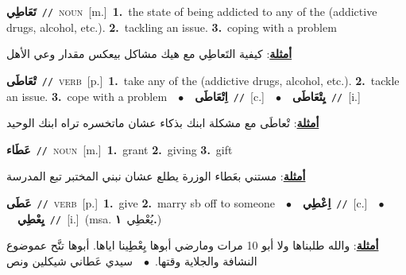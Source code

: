 \documentclass[10pt,a4paper,twoside]{article} %
\begin{document}
\begin{multicols}{2}
{\setlength\topsep{0pt}\textbf{\foreignlanguage{arabic}{تَعَاطِي}}\ {\color{gray}\texttt{//}\color{black}}\ \textsc{noun}\ [m.]\ \textbf{1.}~the state of being addicted to any of the (addictive drugs, alcohol, etc.).  \textbf{2.}~tackling an issue.  \textbf{3.}~coping with a problem\  \begin{flushright}\color{gray}\foreignlanguage{arabic}{\textbf{\underline{\foreignlanguage{arabic}{أمثلة}}}: كيفية التَعاطِي مع هيك مشاكل بيعكس مقدار وعي الأهل}\end{flushright}\color{black}} \vspace{2mm}

{\setlength\topsep{0pt}\textbf{\foreignlanguage{arabic}{تْعَاطَى}}\ {\color{gray}\texttt{//}\color{black}}\ \textsc{verb}\ [p.]\ \textbf{1.}~take any of the (addictive drugs, alcohol, etc.).  \textbf{2.}~tackle an issue.  \textbf{3.}~cope with a problem\ \ $\bullet$\ \ \setlength\topsep{0pt}\textbf{\foreignlanguage{arabic}{اِتْعَاطَى}}\ {\color{gray}\texttt{//}\color{black}}\ [c.]\ \ $\bullet$\ \ \setlength\topsep{0pt}\textbf{\foreignlanguage{arabic}{يِتْعَاطَى}}\ {\color{gray}\texttt{//}\color{black}}\ [i.]\  \begin{flushright}\color{gray}\foreignlanguage{arabic}{\textbf{\underline{\foreignlanguage{arabic}{أمثلة}}}: تْعاطَى مع مشكلة ابنك بذكاء عشان ماتخسره تراه ابنك الوحيد}\end{flushright}\color{black}} \vspace{2mm}

{\setlength\topsep{0pt}\textbf{\foreignlanguage{arabic}{عَطَاء}}\ {\color{gray}\texttt{//}\color{black}}\ \textsc{noun}\ [m.]\ \textbf{1.}~grant  \textbf{2.}~giving  \textbf{3.}~gift\  \begin{flushright}\color{gray}\foreignlanguage{arabic}{\textbf{\underline{\foreignlanguage{arabic}{أمثلة}}}: مستني بعَطاء الوزرة يطلع عشان نبني المختبر تبع المدرسة}\end{flushright}\color{black}} \vspace{2mm}

{\setlength\topsep{0pt}\textbf{\foreignlanguage{arabic}{عَطَى}}\ {\color{gray}\texttt{//}\color{black}}\ \textsc{verb}\ [p.]\ \textbf{1.}~give  \textbf{2.}~marry sb off to someone\ \ $\bullet$\ \ \setlength\topsep{0pt}\textbf{\foreignlanguage{arabic}{اِعْطِي}}\ {\color{gray}\texttt{//}\color{black}}\ [c.]\ \ $\bullet$\ \ \setlength\topsep{0pt}\textbf{\foreignlanguage{arabic}{يِعْطِي}}\ {\color{gray}\texttt{//}\color{black}}\ [i.]\ \color{gray}(msa. \foreignlanguage{arabic}{يُعْطِي}~\foreignlanguage{arabic}{\textbf{١.}})\color{black}\  \begin{flushright}\color{gray}\foreignlanguage{arabic}{\textbf{\underline{\foreignlanguage{arabic}{أمثلة}}}: والله طلبناها ولا أبو 10 مرات ومارضي أبوها يِعْطِينا اياها. أبوها تنَّح عموضوع النشافة والجلاية وقتها.\ $\bullet$\ \  سيدي عَطاني شيكلين ونص}\end{flushright}\color{black}} \vspace{2mm}


\end{multicols}
\end{document}
